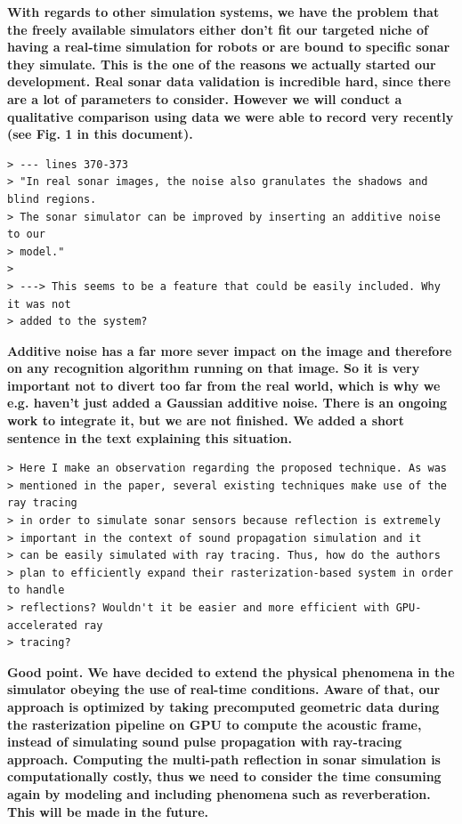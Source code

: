 \documentclass{article}
\begin{document}
\textbf{With regards to other simulation systems, we have the problem that the freely available simulators either don't fit our targeted niche of having a real-time simulation for robots or are bound to specific sonar they simulate. This is the one of the reasons we actually started our development. Real sonar data validation is incredible hard, since there are a lot of parameters to consider. However we will conduct a qualitative comparison using data we were able to record very recently (see Fig. 1 in this document).}

\begin{verbatim}
> --- lines 370-373
> "In real sonar images, the noise also granulates the shadows and blind regions.
> The sonar simulator can be improved by inserting an additive noise to our
> model."
>
> ---> This seems to be a feature that could be easily included. Why it was not
> added to the system?

\end{verbatim}

\textbf{Additive noise has a far more sever impact on the image and therefore on any recognition algorithm running on that image. So it is very important not to divert too far from the real world, which is why we e.g. haven't just added a Gaussian additive noise. There is an ongoing work to integrate it, but we are not finished. We added a short sentence in the text explaining this situation.}

\begin{verbatim}
> Here I make an observation regarding the proposed technique. As was
> mentioned in the paper, several existing techniques make use of the ray tracing
> in order to simulate sonar sensors because reflection is extremely
> important in the context of sound propagation simulation and it
> can be easily simulated with ray tracing. Thus, how do the authors
> plan to efficiently expand their rasterization-based system in order to handle
> reflections? Wouldn't it be easier and more efficient with GPU-accelerated ray
> tracing?
\end{verbatim}

\textbf{Good point. We have decided to extend the physical phenomena in the
simulator obeying the use of real-time conditions. Aware of that, our approach
is optimized by taking precomputed geometric data during the rasterization
pipeline on GPU to compute the acoustic frame, instead of simulating sound pulse propagation with ray-tracing approach. Computing the multi-path reflection in sonar simulation is computationally costly, thus we need to consider the time consuming again by modeling and including phenomena such as reverberation. This will be made in the future.}
\end{document}
